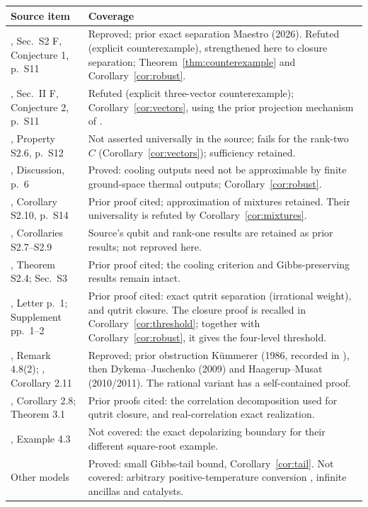 \documentclass[11pt]{article}
\begin{document}
\begin{center}
\small
\begin{tabular}{@{}p{.34\linewidth}p{.60\linewidth}@{}}
\toprule
Source item & Coverage \\
\midrule
\cite{NG}, Sec.\ S2 F, Conjecture 1, p.\ S11 & Reproved; prior exact separation Maestro (2026). Refuted (explicit counterexample), strengthened here to closure separation; Theorem~\ref{thm:counterexample} and Corollary~\ref{cor:robust}.\\[3pt]
\cite{NG1,NG2}, Sec.\ II F, Conjecture 2, p.\ S11 & Refuted (explicit three-vector counterexample); Corollary~\ref{cor:vectors}, using the prior projection mechanism of \cite{MR,MA}.\\[3pt]
\cite{NG}, Property S2.6, p.\ S12 & Not asserted universally in the source; fails for the rank-two $C$ (Corollary~\ref{cor:vectors}); sufficiency retained.\\[3pt]
\cite{NG}, Discussion, p.\ 6 & Proved: cooling outputs need not be approximable by finite ground-space thermal outputs; Corollary~\ref{cor:robust}.\\[3pt]
\cite{NG}, Corollary S2.10, p.\ S14 & Prior proof cited; approximation of mixtures retained. Their universality is refuted by Corollary~\ref{cor:mixtures}.\\[3pt]
\cite{NG}, Corollaries S2.7--S2.9 & Source's qubit and rank-one results are retained as prior results; not reproved here.\\[3pt]
\cite{NG}, Theorem S2.4; Sec.\ S3 & Prior proof cited; the cooling criterion and Gibbs-preserving results remain intact.\\[3pt]
\cite{MA}, Letter p.\ 1; Supplement pp.\ 1--2 & Prior proof cited: exact qutrit separation (irrational weight), and qutrit closure. The closure proof is recalled in Corollary~\ref{cor:threshold}; together with Corollary~\ref{cor:robust}, it gives the four-level threshold.\\[3pt]
\cite{HM}, Remark 4.8(2); \cite{DJ}, Corollary 2.11 & Reproved; prior obstruction K\"ummerer (1986, recorded in \cite{HM}), then Dykema--Juschenko (2009) and Haagerup--Musat (2010/2011). The rational variant has a self-contained proof.\\[3pt]
\cite{DJ}, Corollary 2.8; Theorem 3.1 & Prior proofs cited: the correlation decomposition used for qutrit closure, and real-correlation exact realization.\\[3pt]
\cite{DJ}, Example 4.3 & Not covered: the exact depolarizing boundary for their different square-root example.\\[3pt]
Other models & Proved: small Gibbs-tail bound, Corollary~\ref{cor:tail}. Not covered: arbitrary positive-temperature conversion \cite{DHD,CS}, infinite ancillas and catalysts.\\
\bottomrule
\end{tabular}
\end{center}
\end{document}
